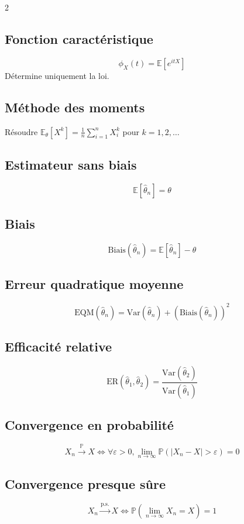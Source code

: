 \documentclass[10pt,a4paper]{article}
\begin{document}
\begin{multicols}{2}
\subsection*{Fonction caractéristique}
\[
\phi_X(t) = \mathbb{E}[e^{itX}]
\]
Détermine uniquement la loi.

\subsection*{Méthode des moments}
Résoudre $\mathbb{E}_\theta[X^k] = \frac{1}{n}\sum_{i=1}^n X_i^k$ pour $k = 1, 2, \ldots$

\subsection*{Estimateur sans biais}
\[
\mathbb{E}[\hat{\theta}_n] = \theta
\]

\subsection*{Biais}
\[
\text{Biais}(\hat{\theta}_n) = \mathbb{E}[\hat{\theta}_n] - \theta
\]

\subsection*{Erreur quadratique moyenne}
\[
\text{EQM}(\hat{\theta}_n) = \text{Var}(\hat{\theta}_n) + (\text{Biais}(\hat{\theta}_n))^2
\]

\subsection*{Efficacité relative}
\[
\text{ER}(\hat{\theta}_1, \hat{\theta}_2) = \frac{\text{Var}(\hat{\theta}_2)}{\text{Var}(\hat{\theta}_1)}
\]

\subsection*{Convergence en probabilité}
\[
X_n \xrightarrow{\mathbb{P}} X \Leftrightarrow \forall \varepsilon > 0, \lim_{n \to \infty} \mathbb{P}(|X_n - X| > \varepsilon) = 0
\]

\subsection*{Convergence presque sûre}
\[
X_n \xrightarrow{\text{p.s.}} X \Leftrightarrow \mathbb{P}(\lim_{n \to \infty} X_n = X) = 1
\]


\end{multicols}
\end{document}
